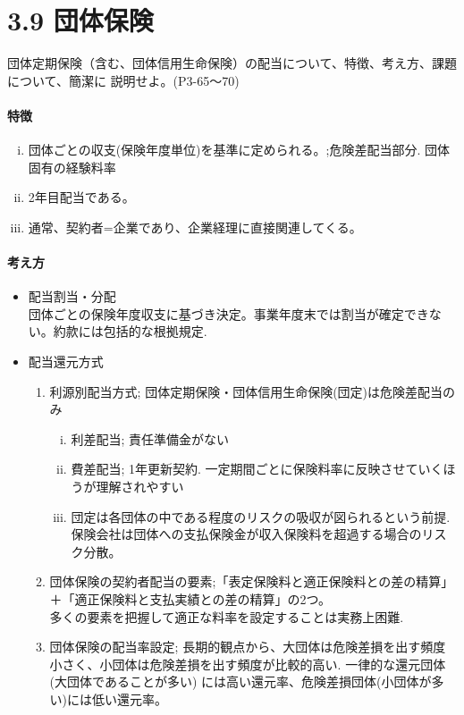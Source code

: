 \documentclass[report,gutter=10mm,fore-edge=10mm,uplatex,dvipdfmx]{jlreq}
\begin{document}
\section{3.9 団体保険}
団体定期保険（含む、団体信用生命保険）の配当について、特徴、考え方、課題について、簡潔に
説明せよ。(P3-65〜70)
\paragraph{特徴}
\begin{enumerate} [(i)]
 \item 団体ごとの収支(保険年度単位)を基準に定められる。;危険差配当部分. 団体固有の経験料率
 \item 2年目配当である。
 \item 通常、契約者=企業であり、企業経理に直接関連してくる。
\end{enumerate}


\paragraph{考え方}

\begin{itemize}
 \item 配当割当・分配\\
団体ごとの保険年度収支に基づき決定。事業年度末では割当が確定できない。約款には包括的な根拠規定. 
 \item 配当還元方式
\begin{enumerate}[(1)]
 \item 利源別配当方式; 団体定期保険・団体信用生命保険(団定)は危険差配当のみ
\begin{enumerate}[(i)]
 \item 利差配当; 責任準備金がない
 \item 費差配当; 1年更新契約. 一定期間ごとに保険料率に反映させていくほうが理解されやすい
 \item 団定は各団体の中である程度のリスクの吸収が図られるという前提. 保険会社は団体への支払保険金が収入保険料を超過する場合のリスク分散。
\end{enumerate}
 \item 団体保険の契約者配当の要素;「表定保険料と適正保険料との差の精算」＋「適正保険料と支払実績との差の精算」の2つ。\\
多くの要素を把握して適正な料率を設定することは実務上困難. 
 \item 団体保険の配当率設定; 長期的観点から、大団体は危険差損を出す頻度小さく、小団体は危険差損を出す頻度が比較的高い. 一律的な還元団体(大団体であることが多い) には高い還元率、危険差損団体(小団体が多い)には低い還元率。
\end{enumerate}
\end{itemize}
\end{document}
